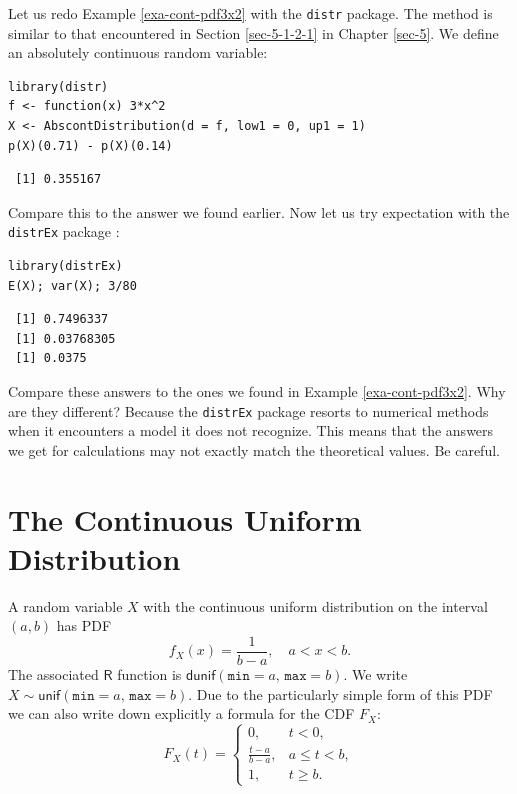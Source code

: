 \documentclass[captions=tableheading]{scrbook}
\begin{document}
\begin{example}
Let us redo Example \ref{exa-cont-pdf3x2} with the \texttt{distr} package. The method is similar to that encountered in Section \ref{sec-5-1-2-1} in Chapter \ref{sec-5}. We define an absolutely continuous random variable:



\begin{verbatim}
library(distr)
f <- function(x) 3*x^2
X <- AbscontDistribution(d = f, low1 = 0, up1 = 1)
p(X)(0.71) - p(X)(0.14)
\end{verbatim}

\begin{verbatim}
 [1] 0.355167
\end{verbatim}

Compare this to the answer we found earlier. Now let us try expectation with the \texttt{distrEx} package \cite{Ruckdescheldistr}:

\begin{verbatim}
library(distrEx)
E(X); var(X); 3/80
\end{verbatim}

\begin{verbatim}
 [1] 0.7496337
 [1] 0.03768305
 [1] 0.0375
\end{verbatim}

Compare these answers to the ones we found in Example \ref{exa-cont-pdf3x2}. Why are they different? Because the \texttt{distrEx} package resorts to numerical methods when it encounters a model it does not recognize. This means that the answers we get for calculations may not exactly match the theoretical values. Be careful.
\end{example}
\section{The Continuous Uniform Distribution}
\label{sec-6-2}
\label{sec-The-Continuous-Uniform}


A random variable \(X\) with the continuous uniform distribution on the interval \((a,b)\) has PDF
\begin{equation}
f_{X}(x)=\frac{1}{b-a}, \quad a < x < b.
\end{equation}
The associated \(\mathsf{R}\) function is \(\mathsf{dunif}(\mathtt{min}=a,\,\mathtt{max}=b)\). We write \(X\sim\mathsf{unif}(\mathtt{min}=a,\,\mathtt{max}=b)\). Due to the particularly simple form of this PDF we can also write down explicitly a formula for the CDF \(F_{X}\):
\begin{equation}
F_{X}(t)=
\begin{cases}
0, & t < 0,\\
\frac{t-a}{b-a}, & a\leq t < b,\\
1, & t \geq b.
\end{cases}
\label{eq-unif-cdf}
\end{equation}
\end{document}
